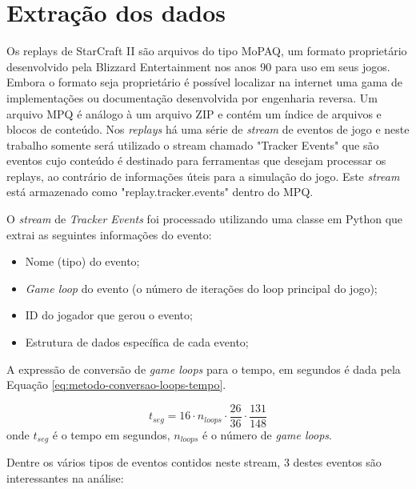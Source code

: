 		\section{Extração dos dados}

Os \glspl{replay} de StarCraft II são arquivos do tipo MoPAQ, um formato proprietário desenvolvido pela Blizzard Entertainment nos anos 90 para uso em seus jogos. Embora o formato seja proprietário é possível localizar na internet uma gama de implementações ou documentação desenvolvida por engenharia reversa. Um arquivo MPQ é análogo à um arquivo ZIP e contém um índice de arquivos e blocos de conteúdo. Nos \textit{\glspl{replay}} há uma série de \textit{stream} de eventos de jogo e neste trabalho somente será utilizado o stream chamado "Tracker Events" que são eventos cujo conteúdo é destinado para ferramentas que desejam processar os \glspl{replay}, ao contrário de informações úteis para a simulação do jogo. Este \textit{stream} está armazenado como "replay.tracker.events" dentro do MPQ.

O \textit{stream} de \textit{Tracker Events} foi processado utilizando uma classe em Python que extrai as seguintes informações do evento:

\begin{itemize}
	\item Nome (tipo) do evento;
	\item \textit{Game loop} do evento (o número de iterações do loop principal do jogo);
	\item ID do jogador que gerou o evento;
	\item Estrutura de dados específica de cada evento;
\end{itemize}

A expressão de conversão de \textit{game loops} para o tempo, em segundos é dada pela Equação \ref{eq:metodo-conversao-loops-tempo}.

\begin{equation}
	t_{seg} = 16 \cdot n_{loops} \cdot \frac{26}{36} \cdot \frac{131}{148}
	\label{eq:metodo-conversao-loops-tempo}
\end{equation}
\noindent onde $t_{seg}$ é o tempo em segundos, $n_{loops}$ é o número de \textit{game loops}.

Dentre os vários tipos de eventos contidos neste stream, 3 destes eventos são interessantes na análise:

